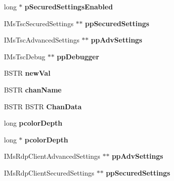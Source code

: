 \begin{DoxyCompactItemize}
long $\ast$ {\bfseries p\+Secured\+Settings\+Enabled}
\item 
\mbox{\label{struct_i_ms_rdp_client_vtbl_a7ee30a4b6d758bac0ab51977fb06bf9b}} 
I\+Ms\+Tsc\+Secured\+Settings $\ast$$\ast$ {\bfseries pp\+Secured\+Settings}
\item 
\mbox{\label{struct_i_ms_rdp_client_vtbl_a69d350fd9e51743ae4ea04d4663375f5}} 
I\+Ms\+Tsc\+Advanced\+Settings $\ast$$\ast$ {\bfseries pp\+Adv\+Settings}
\item 
\mbox{\label{struct_i_ms_rdp_client_vtbl_ac99e175d6df8d51dd4f3e191dee11528}} 
I\+Ms\+Tsc\+Debug $\ast$$\ast$ {\bfseries pp\+Debugger}
\item 
\mbox{\label{struct_i_ms_rdp_client_vtbl_abd01af37efe189c7fec928211522dafb}} 
B\+S\+TR {\bfseries new\+Val}
\item 
\mbox{\label{struct_i_ms_rdp_client_vtbl_ac891853af494eed88c04e8bc15989bec}} 
B\+S\+TR {\bfseries chan\+Name}
\item 
\mbox{\label{struct_i_ms_rdp_client_vtbl_a07370dee3ea6a3893a9ccd160270b1eb}} 
B\+S\+TR B\+S\+TR {\bfseries Chan\+Data}
\item 
\mbox{\label{struct_i_ms_rdp_client_vtbl_a8ed28e17c5dc0df3cfda388081109cba}} 
long {\bfseries pcolor\+Depth}
\item 
\mbox{\label{struct_i_ms_rdp_client_vtbl_a06cf80f0a16f11a902122eb420f80460}} 
long $\ast$ {\bfseries pcolor\+Depth}
\item 
\mbox{\label{struct_i_ms_rdp_client_vtbl_aa6e90f7a441e5e19699332fb3d784783}} 
I\+Ms\+Rdp\+Client\+Advanced\+Settings $\ast$$\ast$ {\bfseries pp\+Adv\+Settings}
\item 
\mbox{\label{struct_i_ms_rdp_client_vtbl_a6db8c61a457cedd2e7045528aa69f790}} 
I\+Ms\+Rdp\+Client\+Secured\+Settings $\ast$$\ast$ {\bfseries pp\+Secured\+Settings}
$$
\end{DoxyCompactItemize}
